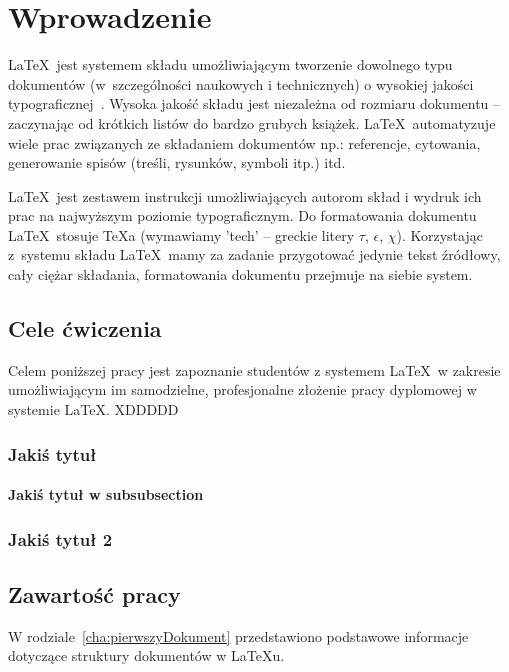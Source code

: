 \chapter{Wprowadzenie}
\label{cha:wprowadzenie}

\LaTeX~jest systemem składu umożliwiającym tworzenie dowolnego typu dokumentów (w~szczególności naukowych i technicznych) o wysokiej jakości typograficznej~\cite{Dil00,Lam92}. Wysoka jakość składu jest niezależna od rozmiaru dokumentu -- zaczynając od krótkich listów do bardzo grubych książek. \LaTeX~automatyzuje wiele prac związanych ze składaniem dokumentów np.: referencje, cytowania, generowanie spisów (treśli, rysunków, symboli itp.) itd.

\LaTeX~jest zestawem instrukcji umożliwiających autorom skład i wydruk ich prac na najwyższym poziomie typograficznym. Do formatowania dokumentu \LaTeX~stosuje \TeX a (wymawiamy 'tech' -- greckie litery $\tau$, $\epsilon$, $\chi$). Korzystając z~systemu składu \LaTeX~mamy za zadanie przygotować jedynie tekst źródłowy, cały ciężar składania, formatowania dokumentu przejmuje na siebie system.


\section{Cele ćwiczenia}
\label{sec:celePracy}

Celem poniższej pracy jest zapoznanie studentów z systemem \LaTeX~w zakresie umożliwiającym im samodzielne, profesjonalne złożenie pracy dyplomowej w systemie \LaTeX.
XDDDDD

\subsection{Jakiś tytuł}


\subsubsection{Jakiś tytuł w subsubsection}

\subsection{Jakiś tytuł 2}


\section{Zawartość pracy}
\label{sec:zawartoscPracy}

W rodziale~\ref{cha:pierwszyDokument} przedstawiono podstawowe informacje dotyczące struktury dokumentów w \LaTeX u.

